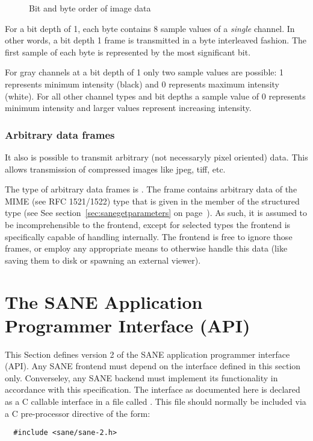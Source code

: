 \documentclass[11pt,DVIps]{report}
\begin{document}
\begin{figure}[htbp]
  \begin{center}
    \leavevmode
    \caption{Bit and byte order of image data}
    \label{fig:pixels}
  \end{center}
\end{figure}

For a bit depth of 1, each byte contains 8 sample values of a {\em single\/}
channel. In other words, a bit depth 1 frame is transmitted in a byte
interleaved fashion. The first sample of each byte is represented by the most
significant bit.

\begin{changebar}
For gray channels at a bit depth of 1 only two sample values are possible: 1
represents minimum intensity (black) and 0 represents maximum intensity
(white).  For all other channel types and bit depths a sample value of 0
represents minimum intensity and larger values represent increasing intensity.

\subsection{Arbitrary data frames}

It also is possible to transmit arbitrary (not necessaryly pixel oriented)
data. This allows transmission of compressed images like jpeg, tiff, etc.

The type of arbitrary data frames is .
The frame contains arbitrary data of the MIME (see RFC 1521/1522) type that is
given in the  member of the 
structured type (see See section~\ref{sec:sanegetparameters} on
page~\pageref{sec:sanegetparameters}).  As such, it is assumed to be
incomprehensible to the frontend, except for selected types the frontend is
specifically capable of handling internally.  The frontend is free to ignore
those frames, or employ any appropriate means to otherwise handle this data
(like saving them to disk or spawning an external viewer).
\end{changebar}

\chapter{The SANE Application Programmer Interface (API)}\label{chap:api}

\begin{changebar}
This Section defines version 2 of the SANE application
programmer interface (API).  Any SANE frontend must depend on the
interface defined in this section only. Converseley, any SANE backend
must implement its functionality in accordance with this
specification. The interface as documented here is declared as a C
callable interface in a file called . This file should
normally be included via a C pre-processor directive of the form:
\begin{verbatim}
  #include <sane/sane-2.h>
\end{verbatim}
\end{changebar}
\end{document}
